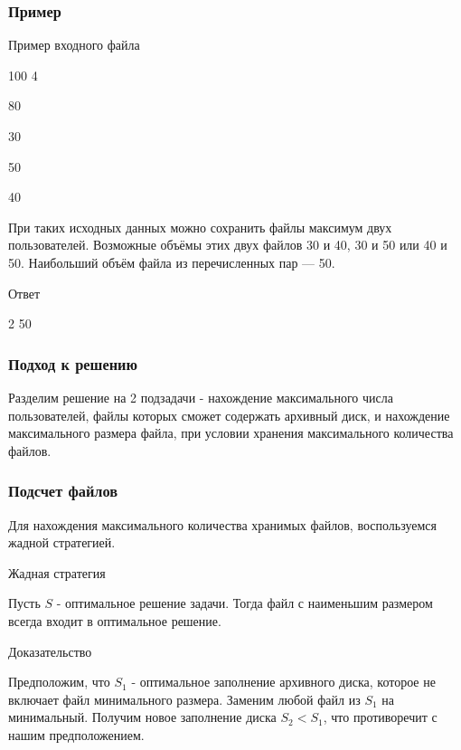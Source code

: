 \documentclass{beamer}
\begin{document}
\begin{frame}

    \frametitle{Пример}

    \begin{block}{Пример входного файла}

        100 4

        80

        30

        50

        40

    \end{block}

    При таких исходных данных можно сохранить файлы максимум двух пользователей. Возможные объёмы этих двух файлов \alert{30 и 40}, \alert{30 и 50} или \alert{40 и 50}. Наибольший объём файла из перечисленных пар — \alert{50}.

    \begin{alertblock}{Ответ}

        2 50

    \end{alertblock}

\end{frame}

\begin{frame}

    \frametitle{Подход к решению}

    Разделим решение на 2 подзадачи - нахождение максимального числа пользователей, файлы которых сможет содержать архивный диск, и нахождение максимального размера файла, при условии хранения максимального количества файлов.

\end{frame}

\begin{frame}

    \frametitle{Подсчет файлов}

    Для нахождения максимального количества хранимых файлов, воспользуемся \alert{жадной} стратегией.

    \pause

    \begin{alertblock}{Жадная стратегия}

        Пусть $S$ - оптимальное решение задачи. Тогда файл с наименьшим размером всегда входит в оптимальное решение.

    \end{alertblock}

    \pause

    \begin{block}{Доказательство}

        Предположим, что $S_1$ - оптимальное заполнение архивного диска, которое не включает файл минимального размера. Заменим любой файл из $S_1$ на минимальный. Получим новое заполнение диска $S_2 < S_1$, что противоречит с нашим предположением. 

    \end{block}

\end{frame}
\end{document}
